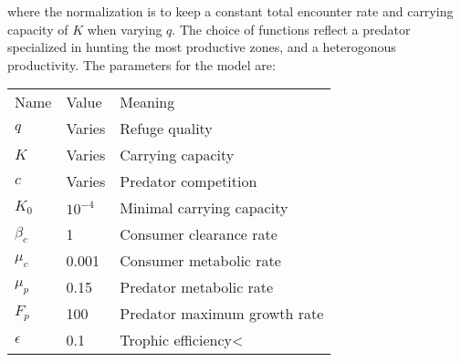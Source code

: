 where the normalization is to keep a constant total encounter rate and carrying capacity of $K$ when varying $q$. The choice of functions reflect a predator specialized in hunting the most productive zones, and a heterogonous productivity.
The parameters for the model are: \\
\begin{tabular}{l l l}
  Name & Value & Meaning \\
  $q$ & Varies & Refuge quality \\
  $K$ & Varies & Carrying capacity \\
  $c$ & Varies & Predator competition \\
  $K_0$ & $10^{-4}$ & Minimal carrying capacity \\
  $\beta_c$ & 1 & Consumer clearance rate \\
  $\mu_c$ & 0.001 & Consumer metabolic rate \\
  $\mu_p$ & 0.15 & Predator metabolic rate \\
  $F_p$ & 100 & Predator maximum growth rate \\
  $\epsilon$ & 0.1 & Trophic efficiency<
\end{tabular}
